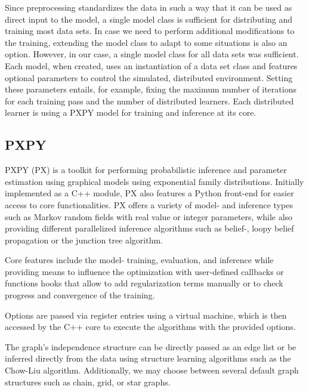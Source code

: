 

Since preprocessing standardizes the data in such a way that it can be used as direct input to the model, a single model class is sufficient for distributing and training most data sets.
In case we need to perform additional modifications to the training, extending the model class to adapt to some situations is also an option.
However, in our case, a single model class for all data sets was sufficient.
Each model, when created, uses an instantiation of a data set class and features optional parameters to control the simulated, distributed environment. 
Setting these parameters entails, for example, fixing the maximum number of iterations for each training pass and the number of distributed learners.
Each distributed learner is using a PXPY model for training and inference at its core.

\subsection{PXPY}
PXPY\cite{piatkowski2018exponential} (PX) is a toolkit for performing probabilistic inference and parameter estimation using graphical models using exponential family distributions.
Initially implemented as a C++ module, PX also features a Python front-end for easier access to core functionalities.
PX offers a variety of model- and inference types such as Markov random fields with real value or integer parameters, while also providing different parallelized inference algorithms such as belief-, loopy belief propagation or the junction tree algorithm.

Core features include the model- training, evaluation, and inference while providing means to influence the optimization with user-defined callbacks or functions hooks that allow to add regularization terms manually or to check progress and convergence of the training.

Options are passed via register entries using a virtual machine, which is then accessed by the C++ core to execute the algorithms with the provided options.

The graph's independence structure can be directly passed as an edge list or be inferred directly from the data using structure learning algorithms such as the Chow-Liu algorithm.
Additionally, we may choose between several default graph structures such as chain, grid, or star graphs.

